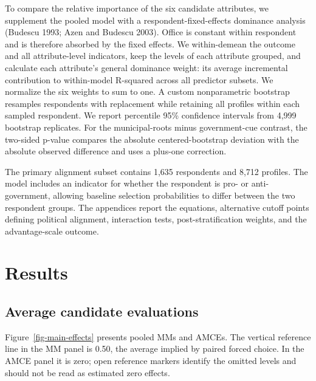 \documentclass[
  letterpaper,
  DIV=11,
  numbers=noendperiod]{scrartcl}
\newcommand{\criticmarkupadd}[1]{#1}
\newcommand{\criticmarkuprm}[1]{}
\begin{document}
\criticmarkupadd{To compare the relative importance of the six candidate
attributes, we supplement the pooled model with a
respondent-fixed-effects dominance analysis (Budescu 1993; Azen and
Budescu 2003). Office is constant within respondent and is therefore
absorbed by the fixed effects. We within-demean the outcome and all
attribute-level indicators, keep the levels of each attribute grouped,
and calculate each attribute's general dominance weight: its average
incremental contribution to within-model R-squared across all predictor
subsets. We normalize the six weights to sum to one. A custom
nonparametric bootstrap resamples respondents with replacement while
retaining all profiles within each sampled respondent. We report
percentile 95\% confidence intervals from 4,999 bootstrap replicates.
For the municipal-roots minus government-cue contrast, the two-sided
p-value compares the absolute centered-bootstrap deviation with the
absolute observed difference and uses a plus-one correction.}

The \criticmarkuprm{respondent}\criticmarkupadd{primary} alignment
\criticmarkuprm{measure uses the 0--10 question about Donald Tusk's
government and coalition. Scores 0--3 define anti-government respondents
and 7--10 pro-government respondents. Excluding middle-position
respondents and neutral profiles leaves}\criticmarkupadd{subset
contains} 1,635 respondents and 8,712 profiles. The model
\criticmarkuprm{controls}\criticmarkupadd{includes an indicator} for
\criticmarkupadd{whether the }respondent \criticmarkuprm{attitude
group.}\criticmarkupadd{is pro- or anti-government, allowing baseline
selection probabilities to differ between the two respondent groups.}
The appendices report the equations, alternative
\criticmarkuprm{cutoffs,}\criticmarkupadd{cutoff points defining
political alignment,} interaction tests, post-stratification weights,
and the advantage-scale outcome.

\section{Results}\label{results}

\subsection{Average candidate
evaluations}\label{average-candidate-evaluations}

Figure~\ref{fig-main-effects} presents pooled MMs and AMCEs. The
vertical reference line in the MM panel is 0.50, the average implied by
paired forced choice. In the AMCE panel it is zero; open reference
markers identify the omitted levels and should not be read as estimated
zero effects.
\end{document}
